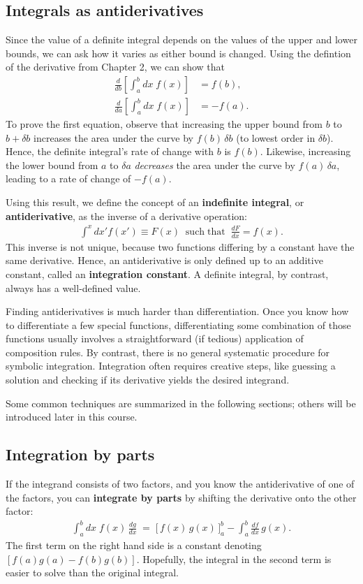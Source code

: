 \documentclass[10pt,a4paper]{article}
\begin{document}
\subsection{Integrals as antiderivatives}
\label{integrals-as-antiderivatives}

Since the value of a definite integral depends on the values of the
upper and lower bounds, we can ask how it varies as either bound is
changed. Using the defintion of the derivative from Chapter 2, we can
show that
\begin{align}
  \frac{d}{db} \left[\int_a^b dx\; f(x)\right] &= f(b), \\
  \frac{d}{da} \left[\int_a^b dx\; f(x)\right] &= -f(a).
\end{align}
To prove the first equation, observe that increasing the upper bound
from $b$ to $b + \delta b$ increases the area under the curve by $f(b)
\, \delta b$ (to lowest order in $\delta b$).  Hence, the definite
integral's rate of change with $b$ is $f(b)$.  Likewise, increasing
the lower bound from $a$ to $\delta a$ \textit{decreases} the area
under the curve by $f(a) \, \delta a$, leading to a rate of change of
$-f(a)$.

Using this result, we define the concept of an \textbf{indefinite
  integral}, or \textbf{antiderivative}, as the inverse of a
derivative operation:
\begin{align}
  \int^x dx' f(x') \equiv F(x) \;\;\mathrm{such}\;\mathrm{that}\;\; \frac{dF}{dx} = f(x).
\end{align}
This inverse is not unique, because two functions differing by a
constant have the same derivative. Hence, an antiderivative is only
defined up to an additive constant, called an \textbf{integration
  constant}. A definite integral, by contrast, always has a
well-defined value.

Finding antiderivatives is much harder than differentiation.  Once you
know how to differentiate a few special functions, differentiating
some combination of those functions usually involves a straightforward
(if tedious) application of composition rules.  By contrast, there is
no general systematic procedure for symbolic integration.  Integration
often requires creative steps, like guessing a solution and checking
if its derivative yields the desired integrand.

Some common techniques are summarized in the following sections;
others will be introduced later in this course.

\subsection{Integration by parts}
If the integrand consists of two factors, and you know the
antiderivative of one of the factors, you can \textbf{integrate by
  parts} by shifting the derivative onto the other factor:
\begin{align}
  \int_a^b dx \; f(x) \, \frac{dg}{dx} \;=\; \Big[\,f(x)\, g(x)\,\Big]_a^b - \int_a^b \frac{df}{dx}\, g(x).
\end{align}
The first term on the right hand side is a constant denoting
$[f(a)g(a) - f(b)g(b)]$.  Hopefully, the integral in the second term
is easier to solve than the original integral.
\end{document}
